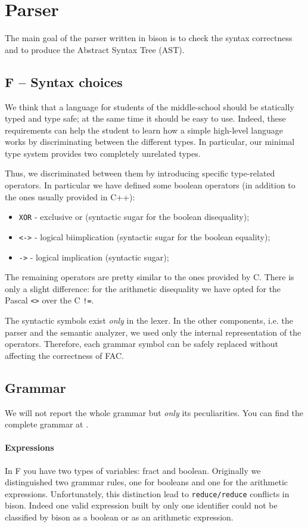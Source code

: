 \section{Parser}
\label{sec:parser}
The main goal of the parser written in bison is to check the
syntax correctness and to produce the Abstract Syntax Tree (AST).

\subsection{F -- Syntax choices}
We think that a language for students of the middle-school should be
statically typed and type safe; at the same time it should be easy to use.
Indeed, these requirements can help the student to learn how a simple
high-level language works by discriminating between the different types.
In particular, our minimal type system provides two completely unrelated types.


Thus, we discriminated between them by introducing specific type-related
operators. In particular we have defined some boolean operators
(in addition to the ones usually provided in C++):
\begin{itemize}
	\item \verb|XOR| - exclusive or (syntactic sugar for the boolean disequality);
	\item \verb|<->| - logical biimplication (syntactic sugar for the boolean 
	equality);
	\item \verb|->| - logical implication (syntactic sugar);
\end{itemize}

The remaining operators are pretty similar to the ones provided by C.
There is only a slight difference: for the arithmetic disequality we have opted
for the Pascal \verb|<>| over the C \verb|!=|.

The syntactic symbols exist \emph{only} in the lexer. In the
other components, i.e. the parser and the semantic analyzer, we used
only the internal representation of the operators. Therefore, each grammar
symbol can be safely replaced without affecting the correctness of FAC.

\subsection{Grammar}
We will not report the whole grammar but \emph{only} its peculiarities.
You can find the complete grammar at .

\paragraph{Expressions}
In F you have two types of variables: fract and boolean.
Originally we distinguished two grammar rules, one for booleans and
one for the arithmetic expressions. Unfortunately, this distinction
lead to \verb|reduce/reduce| conflicts in bison.
Indeed one valid expression built by only one identifier could not be
classified by bison as a boolean or as an arithmetic expression.


